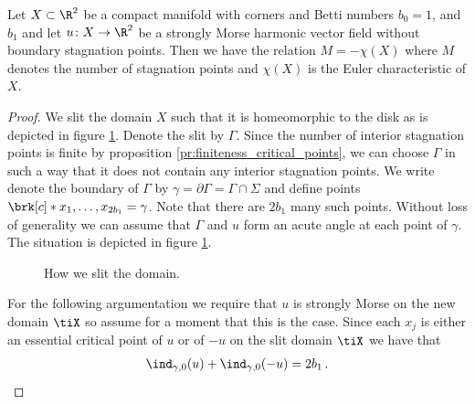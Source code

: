\begin{proposition}\label{pr:n2_hvf_noInflowNoOutflow}
  Let $X\subset\R^2$ be a compact manifold with corners and Betti numbers $b_0=1$, and $b_1$
  and let $u\colon X\to\R^2$ be
  a strongly Morse harmonic vector field without boundary stagnation points.
  Then we have the relation $M=-\chi(X)$ where $M$ denotes the number of stagnation points and
  $\chi(X)$ is the Euler characteristic of $X$.
\end{proposition}
\begin{proof}
  We slit the domain $X$ such that it is homeomorphic to the disk as is 
  depicted in figure \ref{fi:n2_hvf_slitDomain}.
  Denote the slit by $\Gamma$. Since the number of interior stagnation points is 
  finite by proposition \ref{pr:finiteness_critical_points}, we can choose $\Gamma$ in such a way that it does not contain
  any interior stagnation points.
  We write denote the boundary of $\Gamma$ by $\gamma=\partial\Gamma=\Gamma\cap\Sigma$
  and define points $\brk[c]*{x_1,\dots,x_{2b_1}}=\gamma$.
  Note that there are $2b_1$ many such points.
  Without loss of generality we can assume that $\Gamma$ and $u$ form an acute angle at each point of $\gamma$.
  The situation is depicted in figure \ref{fi:n2_hvf_slitDomain}.
  \begin{figure}
    \centering
    
    \caption{How we slit the domain.}
    \label{fi:n2_hvf_slitDomain}
  \end{figure}
  For the following argumentation we require that $u$ is strongly Morse on the new domain $\tiX$ 
  so assume for a moment that this is the case.
  Since each $x_j$ is either an essential critical point of $u$ or of $-u$ on the slit domain $\tiX$ we have that
  \begin{align}
    \ind_{\gamma,0}(u)+\ind_{\gamma,0}(-u)=2b_1\,.\label{eq:n2_hvf_noInflowNoOutflow_relgamma}

\end{align}
\end{proof}
